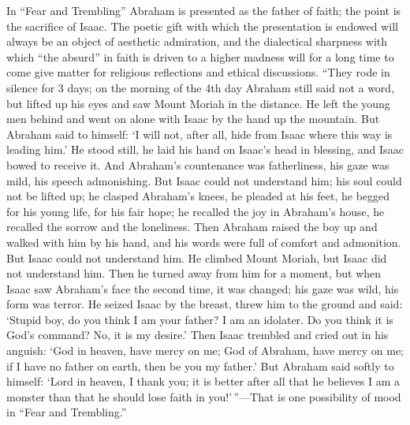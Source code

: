 \documentclass[12pt,a4paper,openany]{book}
\newcommand{\opage}[1]{\marginnote{\footnotesize\textit{[#1]}}}
\begin{document}
In ``Fear and Trembling'' Abraham is presented as the father of faith;
the point is the sacrifice of Isaac. The poetic gift \opage{56}with which the
presentation is endowed will always be an object of aesthetic admiration,
and the dialectical sharpness with which ``the absurd'' in faith is
driven to a higher madness will for a long time to come give matter for
religious reflections and ethical discussions. ``They rode in silence for
3 days; on the morning of the 4th day Abraham still said not a word, but
lifted up his eyes and saw Mount Moriah in the distance. He left the
young men behind and went on alone with Isaac by the hand up the
mountain. But Abraham said to himself: `I will not, after all, hide from
Isaac where this way is leading him.' He stood still, he laid his hand on
Isaac's head in blessing, and Isaac bowed to receive it. And Abraham's
countenance was fatherliness, his gaze was mild, his speech admonishing.
But Isaac could not understand him; his soul could not be lifted up; he
clasped Abraham's knees, he pleaded at his feet, he begged for his young
life, for his fair hope; he recalled the joy in Abraham's house, he
recalled the sorrow and the loneliness. Then Abraham raised the boy up and
walked with him by his hand, and his words were full of comfort and
admonition. But Isaac could not understand him. He climbed Mount Moriah,
but Isaac did not understand him. Then he turned away from him for a
moment, but when Isaac saw Abraham's face the second time, it was
changed; his gaze was wild, his form was terror. He seized Isaac by the
breast, threw him to the ground and said: `Stupid boy, do you think I am
your father? I am an idolater. Do you think it is God's command? No, it
is my desire.' Then Isaac trembled and cried out in his anguish: `God in
heaven, have mercy on me; God of Abraham, \opage{57}have mercy on me; if I have no
father on earth, then be you my father.' But Abraham said softly to
himself: `Lord in heaven, I thank you; it is better after all that he
believes I am a monster than that he should lose faith in you!'\,''---That
is one possibility of mood in ``Fear and Trembling.''
\end{document}
